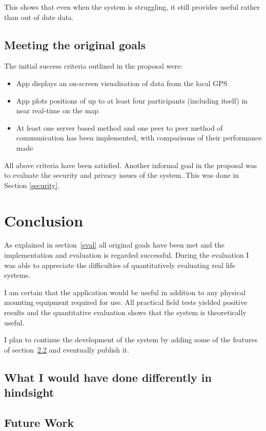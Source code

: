 This shows that even when the system is struggling, it still provides useful rather than out of date data.

\section{Meeting the original goals}
The initial success criteria outlined in the proposal were:
\begin{itemize}
\item{App displays an on-screen visualisation of data from the local GPS}
\item{App plots positions of up to at least four participants (including itself) in
near real-time on the map}
\item{At least one server based method and one peer to peer method of communication has been implemented, with comparisons of their performance made}
\end{itemize}

All above criteria have been satisfied. Another informal goal in the proposal was to evaluate the security and privacy issues of the system. This was done in Section \ref{security}.

\cleardoublepage
\chapter{Conclusion}

As explained in section~\ref{eval} all original goals have been met and the implementation and evaluation is regarded successful.
During the evaluation I was able to appreciate the difficulties of quantitatively evaluating real life systems.

I am certain that the application would be useful in addition to any physical mounting equipment required for use. All practical field tests yielded positive results and the quantitative evaluation shows that the system is theoretically useful.

I plan to continue the development of the system by adding some of the features of section~\ref{future} and eventually publish it.

\section{What I would have done differently in hindsight}


\section{Future Work}
\label{future}

